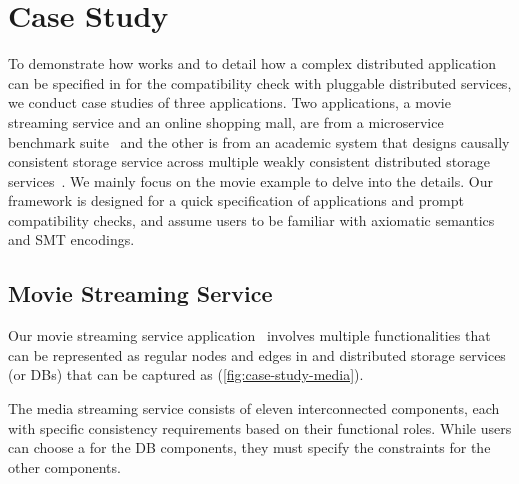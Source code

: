 \section{Case Study}
\label{sec:cs}

To demonstrate how \sysname{} works and to detail how a complex distributed
application can be specified in \sysname{} for the compatibility check with
pluggable distributed services, we conduct case studies of three applications.
Two applications, a movie streaming service and an online shopping
mall, are from
a microservice benchmark suite~\cite{gan2019an} and the other is from an
academic system that designs causally consistent storage service
across multiple weakly consistent distributed storage services~\cite{boltoncc}.
We mainly focus on the movie example to delve into the details.
Our framework is designed for a quick specification of applications
and prompt compatibility checks, and assume users to be familiar with
axiomatic semantics and SMT encodings.

\subsection{Movie Streaming Service}

Our movie streaming service application~\cite{gan2019an} involves
multiple functionalities that can be represented as
regular nodes and edges in \sysgraph{} and distributed storage services (or DBs)
that can be captured as \sysmods{} (\cref{fig:case-study-media}).

The media streaming service consists of eleven interconnected
components, each with specific consistency requirements based on
their functional roles. While users can choose a \sysmod{} for the
DB components, they must specify the constraints for the other components.

